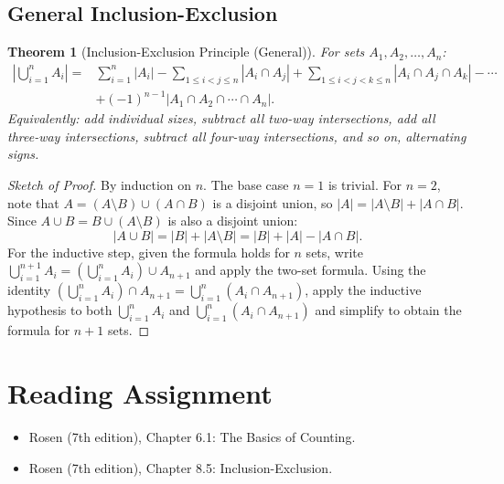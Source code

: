\documentclass[11pt, a4paper, notitlepage]{report}
\newtheorem{theorem}{Theorem}[section]
\theoremstyle{definition}
\theoremstyle{remark}
\begin{document}
\subsection{General Inclusion-Exclusion}

\begin{theorem}[Inclusion-Exclusion Principle (General)]
\label{thm:ieg}
For sets $A_1, A_2, \ldots, A_n$:
\begin{align*}
  \left|\bigcup_{i=1}^{n} A_i\right| =
    &\sum_{i=1}^{n} |A_i|
    - \sum_{1 \le i < j \le n} |A_i \cap A_j|
    + \sum_{1 \le i < j < k \le n} |A_i \cap A_j \cap A_k|
    - \cdots \\
    &+ (-1)^{n-1} |A_1 \cap A_2 \cap \cdots \cap A_n|.
\end{align*}
Equivalently: add individual sizes, subtract all two-way intersections, add all three-way
intersections, subtract all four-way intersections, and so on, alternating signs.
\end{theorem}

\begin{proof}[Sketch of Proof]
By induction on $n$. The base case $n=1$ is trivial. For $n=2$, note that $A = (A \setminus B)
\cup (A \cap B)$ is a disjoint union, so $|A| = |A \setminus B| + |A \cap B|$. Since
$A \cup B = B \cup (A \setminus B)$ is also a disjoint union:
\[
  |A \cup B| = |B| + |A \setminus B| = |B| + |A| - |A \cap B|.
\]
For the inductive step, given the formula holds for $n$ sets, write
$\bigcup_{i=1}^{n+1} A_i = \left(\bigcup_{i=1}^{n} A_i\right) \cup A_{n+1}$
and apply the two-set formula. Using the identity
$\left(\bigcup_{i=1}^{n} A_i\right) \cap A_{n+1} = \bigcup_{i=1}^{n} (A_i \cap A_{n+1})$,
apply the inductive hypothesis to both $\bigcup_{i=1}^n A_i$ and
$\bigcup_{i=1}^n (A_i \cap A_{n+1})$ and simplify to obtain the formula for $n+1$ sets.
\end{proof}

\section*{Reading Assignment}

\begin{itemize}
  \item Rosen (7th edition), Chapter 6.1: The Basics of Counting.
  \item Rosen (7th edition), Chapter 8.5: Inclusion-Exclusion.
\end{itemize}
\end{document}
